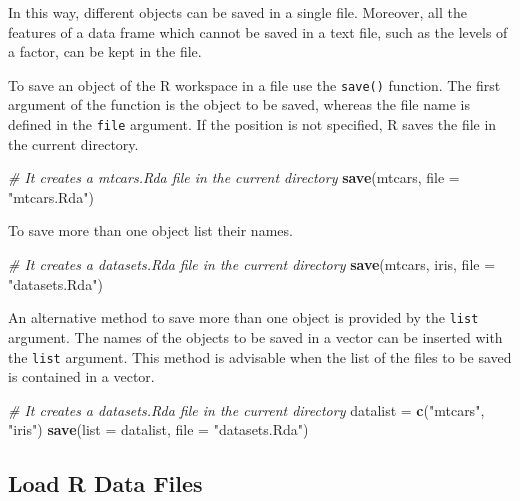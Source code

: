 \documentclass[]{book}
\newenvironment{Shaded}{\begin{snugshade}}{\end{snugshade}}
\newcommand{\KeywordTok}[1]{\textcolor[rgb]{0.13,0.29,0.53}{\textbf{{#1}}}}
\newcommand{\DataTypeTok}[1]{\textcolor[rgb]{0.13,0.29,0.53}{{#1}}}
\newcommand{\StringTok}[1]{\textcolor[rgb]{0.31,0.60,0.02}{{#1}}}
\newcommand{\CommentTok}[1]{\textcolor[rgb]{0.56,0.35,0.01}{\textit{{#1}}}}
\newcommand{\NormalTok}[1]{{#1}}
\begin{document}
In this way, different objects can be saved in a single file. Moreover,
all the features of a data frame which cannot be saved in a text file,
such as the levels of a factor, can be kept in the file.

To save an object of the R workspace in a file use the \texttt{save()}
function. The first argument of the function is the object to be saved,
whereas the file name is defined in the \texttt{file} argument. If the
position is not specified, R saves the file in the current directory.

\begin{Shaded}
\begin{Highlighting}[]
\CommentTok{# It creates a mtcars.Rda file in the current directory}
\KeywordTok{save}\NormalTok{(mtcars, }\DataTypeTok{file =} \StringTok{"mtcars.Rda"}\NormalTok{)}
\end{Highlighting}
\end{Shaded}

To save more than one object list their names.

\begin{Shaded}
\begin{Highlighting}[]
\CommentTok{# It creates a datasets.Rda file in the current directory}
\KeywordTok{save}\NormalTok{(mtcars, iris, }\DataTypeTok{file =} \StringTok{"datasets.Rda"}\NormalTok{)}
\end{Highlighting}
\end{Shaded}

An alternative method to save more than one object is provided by the
\texttt{list} argument. The names of the objects to be saved in a vector
can be inserted with the \texttt{list} argument. This method is
advisable when the list of the files to be saved is contained in a
vector.

\begin{Shaded}
\begin{Highlighting}[]
\CommentTok{# It creates a datasets.Rda file in the current directory}
\NormalTok{datalist =}\StringTok{ }\KeywordTok{c}\NormalTok{(}\StringTok{"mtcars"}\NormalTok{, }\StringTok{"iris"}\NormalTok{)}
\KeywordTok{save}\NormalTok{(}\DataTypeTok{list =} \NormalTok{datalist, }\DataTypeTok{file =} \StringTok{"datasets.Rda"}\NormalTok{)}
\end{Highlighting}
\end{Shaded}

\subsection{Load R Data Files}\label{load-r-data-files}
\end{document}
